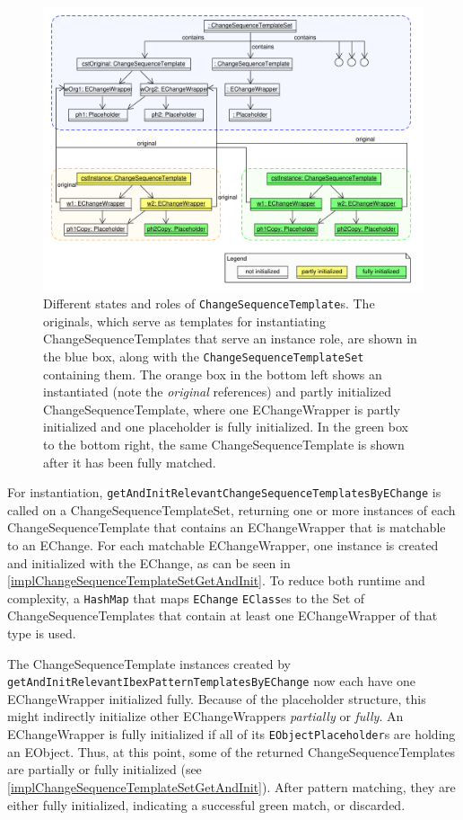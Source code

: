 \begin{figure}
\centering
\includegraphics[width=15.5cm]{figures/ChangeSeqTemplateInstanceDiagramDifferentStates.pdf}
\caption[Different states and roles of \texttt{ChangeSequenceTemplate}s]{Different states and roles of \texttt{ChangeSequenceTemplate}s. The originals, which serve as templates for instantiating ChangeSequenceTemplates that serve an instance role, are shown in the blue box, along with the \texttt{ChangeSequenceTemplateSet} containing them. The orange box in the bottom left shows an instantiated (note the \emph{original} references) and partly initialized ChangeSequenceTemplate, where one EChangeWrapper is partly initialized and one placeholder is fully initialized. In the green box to the bottom right, the same ChangeSequenceTemplate is shown after it has been fully matched.}
\label{fig:ChangeSeqTemplateInstanceDiagramDifferentStates}
\end{figure}

For instantiation, \texttt{getAndInitRelevantChangeSequenceTemplatesByEChange} is called on a ChangeSequenceTemplateSet, returning one or more instances of each ChangeSequenceTemplate that contains an EChangeWrapper that is matchable to an EChange. For each matchable EChangeWrapper, one instance is created and initialized with the EChange, as can be seen in \autoref{implChangeSequenceTemplateSetGetAndInit}.
To reduce both runtime and complexity, a \texttt{HashMap} that maps \texttt{EChange} \texttt{EClass}es to the Set of ChangeSequenceTemplates that contain at least one EChangeWrapper of that type is used.

The ChangeSequenceTemplate instances created by \newline\texttt{getAndInitRelevantIbexPatternTemplatesByEChange} now each have one EChangeWrapper initialized fully. Because of the placeholder structure, this might indirectly initialize other EChangeWrappers \emph{partially} or \emph{fully}.
An EChangeWrapper is fully initialized if all of its \texttt{EObjectPlaceholder}s are holding an EObject.
Thus, at this point, some of the returned ChangeSequenceTemplates are partially or fully initialized (see \autoref{implChangeSequenceTemplateSetGetAndInit}).
After pattern matching, they are either fully initialized, indicating a successful green match, or discarded.

